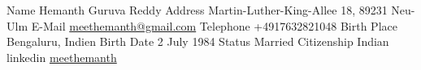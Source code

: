 \begin{cvskills}
  \cvskill
    {Name} %
    {Hemanth Guruva Reddy} %
  \cvskill
    {Address} %
    {Martin-Luther-King-Allee 18, 89231 Neu-Ulm} %
  \cvskill
    {E-Mail} %
    {%
		\href{mailto:meethemanth@gmail.com}{\faEnvelope\acvHeaderIconSep meethemanth@gmail.com}%
    } %
  \cvskill
    {Telephone} %
    {%
		\faMobile\acvHeaderIconSep +4917632821048
    } %
  \cvskill
    {Birth Place} %
    {Bengaluru, Indien} %
  \cvskill
    {Birth Date} %
    {2 July 1984} %
  \cvskill
    {Status} %
    {Married} %
  \cvskill
    {Citizenship} %
    {Indian} %
  \cvskill
    {linkedin} %
    {%
		\href{https://www.linkedin.com/in/meethemanth}{\faLinkedinSquare\acvHeaderIconSep meethemanth}%
    } %
\end{cvskills}
